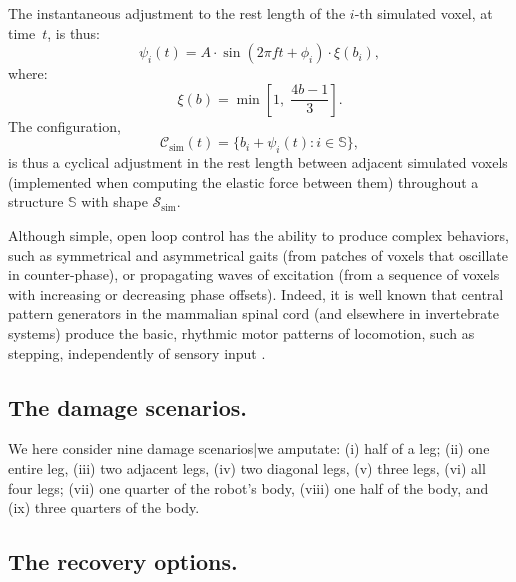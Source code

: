 The instantaneous adjustment to the rest length of the $i$-th simulated voxel, at time~$t$, is thus:
\begin{equation}
\label{eq5:beam_actuation}
\psi_i(t) = A \cdot \sin(2\pi f t + \phi_i) \cdot \xi(b_i) ,
\end{equation}
where:
\begin{equation}
\label{eq5:beam_damp}
\xi(b) = \min\left[ 1,\; \frac{4b - 1}{3} \right] .
\end{equation}
The configuration,
\begin{equation}
\label{eq5:beam_configuration}
\mathcal{C}_{\text{sim}}(t) = \{b_i + \psi_i(t) : i \in \mathbb{S} \} ,
\end{equation}
is thus a cyclical adjustment in the rest length between adjacent simulated voxels (implemented when computing the elastic force between them) throughout a structure $\mathbb{S}$ with shape $\mathcal{S}_{\text{sim}}$.


Although simple, open loop control has the ability to produce complex behaviors,
such as symmetrical and asymmetrical gaits (from patches of voxels that oscillate in counter-phase), or propagating waves of excitation (from a sequence of voxels with increasing or decreasing phase offsets).
Indeed, it is well known that central pattern generators in the mammalian spinal cord (and elsewhere in invertebrate systems) produce the basic, rhythmic motor patterns of locomotion, such as stepping, independently of sensory input \cite{goulding2009circuits}.


\subsection*{The damage scenarios.}


We here consider nine damage scenarios|we amputate: (i) half of a leg; (ii) one entire leg, (iii) two adjacent legs, (iv) two diagonal legs, (v) three legs, (vi) all four legs; (vii) one quarter of the robot's body, (viii) one half of the body, and (ix) three quarters of the body.




\subsection*{The recovery options.}


